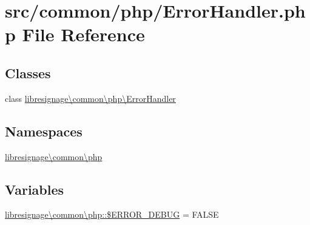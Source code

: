 \hypertarget{ErrorHandler_8php}{}\section{src/common/php/\+Error\+Handler.php File Reference}
\label{ErrorHandler_8php}
\subsection*{Classes}
\begin{DoxyCompactItemize}
\item 
class \hyperlink{classlibresignage_1_1common_1_1php_1_1ErrorHandler}{libresignage\textbackslash{}common\textbackslash{}php\textbackslash{}\+Error\+Handler}
\end{DoxyCompactItemize}
\subsection*{Namespaces}
\begin{DoxyCompactItemize}
\item 
 \hyperlink{namespacelibresignage_1_1common_1_1php}{libresignage\textbackslash{}common\textbackslash{}php}
\end{DoxyCompactItemize}
\subsection*{Variables}
\begin{DoxyCompactItemize}
\item 
\hyperlink{namespacelibresignage_1_1common_1_1php_a48b22bb83bd8a2be3211e68521aef389}{libresignage\textbackslash{}common\textbackslash{}php\+::\$\+E\+R\+R\+O\+R\+\_\+\+D\+E\+B\+UG} = F\+A\+L\+SE
\end{DoxyCompactItemize}
